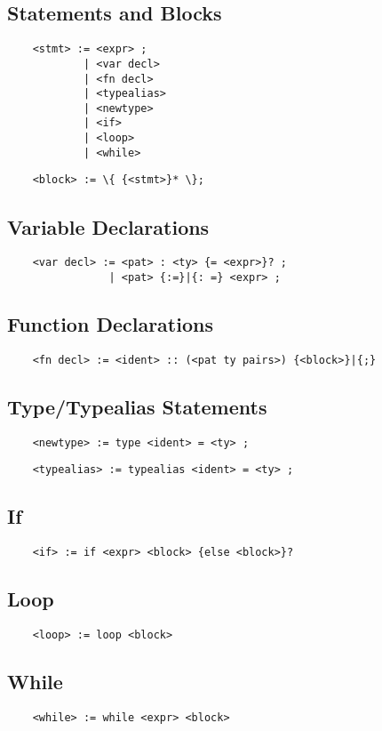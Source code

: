\documentclass[a4paper]{article}
\begin{document}
\subsection{Statements and Blocks}

\begin{verbatim}
    <stmt> := <expr> ;
            | <var decl>
            | <fn decl>
            | <typealias>
            | <newtype>
            | <if>
            | <loop>
            | <while>
\end{verbatim}

\begin{verbatim}
    <block> := \{ {<stmt>}* \};
\end{verbatim}

\subsection{Variable Declarations}

\begin{verbatim}
    <var decl> := <pat> : <ty> {= <expr>}? ;
                | <pat> {:=}|{: =} <expr> ;
\end{verbatim}

\subsection{Function Declarations}

\begin{verbatim}
    <fn decl> := <ident> :: (<pat ty pairs>) {<block>}|{;}
\end{verbatim}

\subsection{Type/Typealias Statements}

\begin{verbatim}
    <newtype> := type <ident> = <ty> ;
\end{verbatim}

\begin{verbatim}
    <typealias> := typealias <ident> = <ty> ;
\end{verbatim}

\subsection{If}

\begin{verbatim}
    <if> := if <expr> <block> {else <block>}?
\end{verbatim}

\subsection{Loop}

\begin{verbatim}
    <loop> := loop <block>
\end{verbatim}

\subsection{While}

\begin{verbatim}
    <while> := while <expr> <block>
\end{verbatim}
\end{document}
